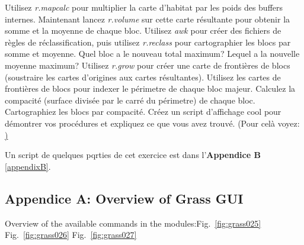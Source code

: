Utilisez \textit{r.mapcalc} pour multiplier la carte d'habitat par les poids des buffers internes.
Maintenant lancez \textit{r.volume }sur cette carte r\'esultante pour obtenir la somme et la moyenne de chaque bloc.
Utilisez  \textit{awk} pour cr\'eer des fichiers de r\`egles de r\'eclassification, puis utilisez \textit{r.reclass} pour cartographier les blocs par somme et moyenne.
Quel bloc a le nouveau total maximum? Lequel a la nouvelle moyenne maximum?
Utilisez \textit{r.grow} pour cr\'eer une carte de fronti\`eres de blocs (soustraire les cartes d'origines aux cartes r\'esultantes).
Utilisez les cartes de fronti\`eres de blocs pour indexer le p\'erimetre de chaque bloc majeur. 
Calculez la compacit\'e (surface divis\'ee par le carr\'e du p\'erimetre) de chaque bloc. 
Cartographiez les blocs par compacit\'e. Cr\'eez un script d'affichage cool pour d\'emontrer vos proc\'edures et expliquez ce que vous avez trouv\'e.
(Pour cel\`a voyez: \href{http://www.udel.edu/johnmack/frec682/script_ideas.html})

Un script de quelques pqrties de cet exercice est dans l'\textbf{Appendice B} \ref{appendixB}.

\newpage

\subsection{Appendice A: Overview of Grass GUI}
\label{appendixA}

Overview of the available commands in the modules:Fig.~\ref{fig:grass025} Fig.~\ref{fig:grass026} Fig.~\ref{fig:grass027}

